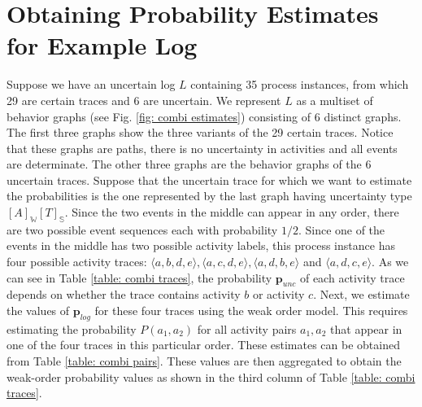 \section{Obtaining Probability Estimates for Example Log}
Suppose we have an uncertain log $L$ containing 35 process instances, from which 29 are certain traces and 6 are uncertain.
We represent $L$ as a multiset of behavior graphs \cite{space} (see Fig. \ref{fig: combi estimates}) consisting of 6 distinct graphs.
The first three graphs show the three variants of the 29 certain traces.
Notice that these graphs are paths, there is no uncertainty in activities and all events are determinate.
The other three graphs are the behavior graphs of the 6 uncertain traces.
Suppose that the uncertain trace for which we want to estimate the probabilities is the one represented by the last graph having uncertainty type $[A]_{\mathbb{W}}[T]_{\mathbb{S}}$.
Since the two events in the middle can appear in any order, there are two possible event sequences each with probability $1/2$.
Since one of the events in the middle has two possible activity labels, this process instance has four possible activity traces:
$\langle a,b,d,e\rangle, \langle a,c,d,e\rangle, \langle a,d,b,e\rangle$ and $\langle a,d,c,e\rangle$.
As we can see in Table \ref{table: combi traces}, the probability $\textbf{p}_{unc}$ of each activity trace depends on whether the trace contains activity $b$ or activity $c$.
Next, we estimate the values of $\textbf{p}_{log}$ for these four traces using the weak order model.
This requires estimating the probability $P(a_1,a_2)$ for all activity pairs $a_1,a_2$ that appear in one of the four traces in this particular order.
These estimates can be obtained from Table \ref{table: combi pairs}.
These values are then aggregated to obtain the weak-order probability values as shown in the third column of Table \ref{table: combi traces}.
%
%
%
%
%
